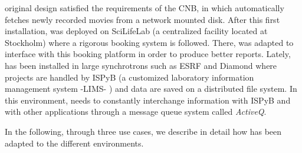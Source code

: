 \scipion original design satisfied the requirements of the CNB, in which \scipion automatically fetches newly recorded movies from a network mounted disk. After this first installation, \scipion was deployed on SciLifeLab (a centralized facility located at Stockholm) where a rigorous booking system is followed. There, \scipion was adapted to interface with this booking platform in order to produce better reports. Lately,  \scipion has been installed in  large synchrotrons  such as ESRF and Diamond  where projects are handled by ISPyB (a customized laboratory information management system -LIMS- \citep{Delageniere2011}) and data are saved on a distributed file system. %
In this environment, \scipion needs to constantly interchange information with ISPyB and with other applications through a message queue system called \emph{ActiveQ}.%

In the following, through three use cases, we describe in detail how \scipion has been adapted to the different environments.









